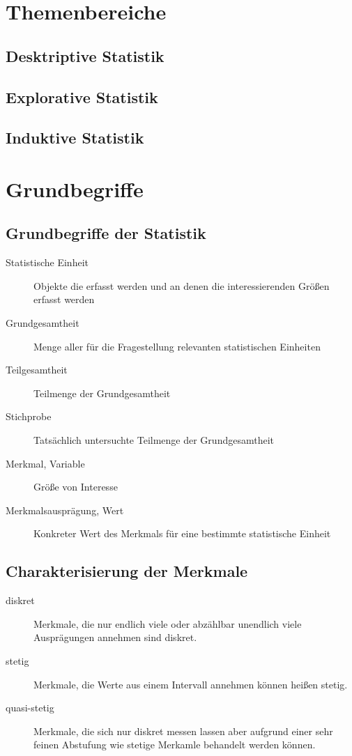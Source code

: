 \chapter{Themenbereiche}
\section{Desktriptive Statistik}

\section{Explorative Statistik}

\section{Induktive Statistik}





\chapter{Grundbegriffe}
\section{Grundbegriffe der Statistik}
\begin{description}
	\item[Statistische Einheit]
	Objekte die erfasst werden und an denen die interessierenden Größen erfasst werden

	\item[Grundgesamtheit]
	Menge aller für die Fragestellung relevanten statistischen Einheiten

	\item[Teilgesamtheit]
	Teilmenge der Grundgesamtheit

	\item[Stichprobe]
	Tatsächlich untersuchte Teilmenge der Grundgesamtheit

	\item[Merkmal, Variable]
	Größe von Interesse

	\item[Merkmalsausprägung, Wert]
	Konkreter Wert des Merkmals für eine bestimmte statistische Einheit
\end{description}

\section{Charakterisierung der Merkmale}
\begin{description}
	\item[diskret]
	Merkmale, die nur endlich viele oder abzählbar unendlich viele Ausprägungen annehmen sind diskret.
	\item[stetig]
	Merkmale, die Werte aus einem Intervall annehmen können heißen stetig.
	\item[quasi-stetig]
	Merkmale, die sich nur diskret messen lassen aber aufgrund einer sehr feinen Abstufung wie stetige Merkamle behandelt werden können.
\end{description}

